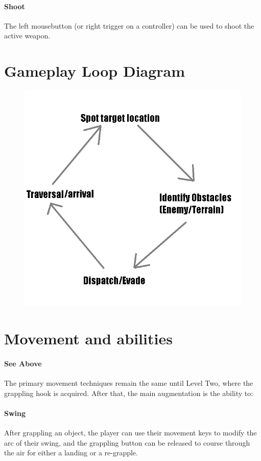\documentclass[letterpaper]{report}
\begin{document}
			\paragraph{Shoot} The left mousebutton (or right trigger on a controller) can be used to shoot the active weapon.
	\section{Gameplay Loop Diagram}
		\begin{figure}[h!]
			\includegraphics[scale=.5]{loop}
		\end{figure}
	\section{Movement and abilities}
		\paragraph{See Above} The primary movement techniques remain the same until Level Two, where the grappling hook is acquired. After that, the main augmentation is the ability to:
		\paragraph{Swing} After grappling an object, the player can use their movement keys to modify the arc of their swing, and the grappling button can be released to course through the air for either a landing or a re-grapple.
\end{document}
